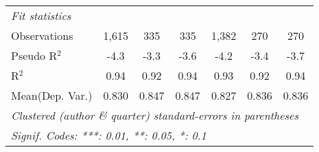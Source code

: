 \begin{tabular}{lcccccc}
   \midrule
   \emph{Fit statistics}\\
   Observations            & 1,615   & 335     & 335          & 1,382   & 270     & 270\\  
   Pseudo R$^2$            & -4.3    & -3.3    & -3.6         & -4.2    & -3.4    & -3.7\\  
   R$^2$                   & 0.94    & 0.92    & 0.94         & 0.93    & 0.92    & 0.94\\  
Mean(Dep. Var.) & 0.830 & 0.847 & 0.847 & 0.827 & 0.836 & 0.836 \\
   \midrule \midrule
   \multicolumn{7}{l}{\emph{Clustered (author \& quarter) standard-errors in parentheses}}\\
   \multicolumn{7}{l}{\emph{Signif. Codes: ***: 0.01, **: 0.05, *: 0.1}}\\
\end{tabular}
\par\endgroup
